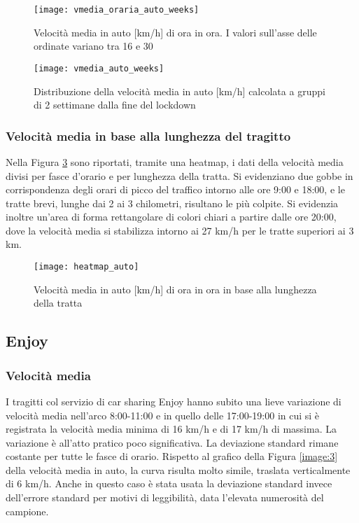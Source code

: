 \begin{figure}[H]
	\centering
	\texttt{[image: vmedia\_oraria\_auto\_weeks]}
	\caption{Velocità media in auto [km/h] di ora in ora. I valori sull'asse delle ordinate variano tra 16 e 30}
	\label{image:5}
\end{figure}



\begin{figure}[H]
	\centering
	\texttt{[image: vmedia\_auto\_weeks]}
	\caption{Distribuzione della velocità media in auto [km/h] calcolata a gruppi di 2 settimane dalla fine del lockdown}
	\label{image:27}
\end{figure}

\subsubsection{Velocità media in base alla lunghezza del tragitto}

Nella Figura \ref{image:6} sono riportati, tramite una heatmap, i dati della velocità media divisi per fasce d'orario e per lunghezza della tratta. Si evidenziano due gobbe in corrispondenza degli orari di picco del traffico intorno alle ore 9:00 e 18:00, e le tratte brevi, lunghe dai 2 ai 3 chilometri, risultano le più colpite. Si evidenzia inoltre un'area di forma rettangolare di colori chiari a partire dalle ore 20:00, dove la velocità media si stabilizza intorno ai 27 km/h per le tratte superiori ai 3 km.

\begin{figure}[H]
	\centering
	\texttt{[image: heatmap\_auto]}
	\caption{Velocità media in auto [km/h] di ora in ora in base alla lunghezza della tratta}
	\label{image:6}
\end{figure}

\pagebreak

\subsection{Enjoy}

\subsubsection{Velocità media}

I tragitti col servizio di car sharing Enjoy hanno subito una lieve variazione di velocità media nell'arco 8:00-11:00 e in quello delle 17:00-19:00 in cui si è registrata la velocità media minima di 16 km/h e di 17 km/h di massima. La variazione è all'atto pratico poco significativa. La deviazione standard rimane costante per tutte le fasce di orario. Rispetto al grafico della Figura \ref{image:3} della velocità media in auto, la curva risulta molto simile, traslata verticalmente di 6 km/h. Anche in questo caso è stata usata la deviazione standard invece dell'errore standard per motivi di leggibilità, data l'elevata numerosità del campione.

